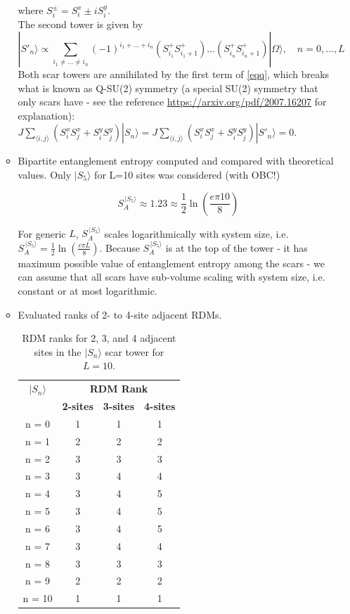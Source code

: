 \documentclass[11pt]{article}
\begin{document}
\begin{itemize}
\begin{itemize}
	where $S_i^\pm = S_i^x \pm i S_i^y$.\\
     The second tower is given by 
     \begin{equation}
	|S'_n\rangle \propto \sum_{i_1 \neq \hdots \neq i_n} (-1)^{i_1 + \hdots + i_n} \left(S^+_{i_1}S^+_{i_1+1}\right)\hdots\left(S^+_{i_n}S^+_{i_n+1}\right)  |\Omega\rangle, \quad n = 0,\hdots,L
	\end{equation}
	Both scar towers are annihilated by the first term of \eqref{eqq}, which breaks what is known as Q-SU(2) symmetry (a special SU(2) symmetry that only scars have - see the reference \href{https://arxiv.org/pdf/2007.16207}{https://arxiv.org/pdf/2007.16207} for explanation): $J \sum_{\langle i,j \rangle} \left( S^x_i S^x_j + S^y_i S^y_j \right)  |S_n\rangle = J \sum_{\langle i,j \rangle} \left( S^x_i S^x_j + S^y_i S^y_j \right)  |S'_n\rangle = 0$.
        \item Bipartite entanglement entropy computed and compared with theoretical values.
        Only $|S_5\rangle$ for L=10 sites was considered (with OBC!)
        
         \begin{equation}
        S^{\,|S_5\rangle}_A \approx 1.23 \approx \frac{1}{2} \ln \left(\frac{e \pi 10}{8}\right)
        \end{equation}
        
        For generic $L$, $S^{\,|S_5\rangle}_A$ scales logarithmically with system size, i.e. $S^{\,|S_5\rangle}_A = \frac{1}{2} \ln \left(\frac{e \pi L}{8}\right)$. Because $S^{\,|S_5\rangle}_A$ is at the top of the tower - it has maximum possible 						value of entanglement entropy among the scars - we can assume that all scars have sub-volume scaling with system size, i.e. constant or at most logarithmic.
        
        \item Evaluated ranks of 2- to 4-site adjacent RDMs.
         \begin{table}[H]
	\centering
	\begin{tabular}{|c|ccc|}
	\hline
	\textbf{$|S_n\rangle$} & \multicolumn{3}{c|}{\textbf{RDM Rank}} \\
	\cline{2-4}
	& \textbf{2-sites} & \textbf{3-sites} & \textbf{4-sites}\\
	\hline
	 n = 0 & 1 & 1 & 1 \\
	 n = 1 & 2 & 2 & 2 \\
	 n = 2 & 3 & 3 & 3 \\
	 n = 3 & 3 & 4 & 4 \\
	 n = 4 & 3 & 4 & 5 \\  
	 n = 5 & 3 & 4 & 5 \\
	 n = 6 & 3 & 4 & 5 \\
	 n = 7 & 3 & 4 & 4 \\
	 n = 8 & 3 & 3 & 3 \\
	 n = 9 & 2 & 2 & 2 \\
	 n = 10 & 1 & 1 & 1 \\
	\hline
	\end{tabular}
	\caption{RDM ranks for 2, 3, and 4 adjacent sites in the $|S_n\rangle$ scar tower for $L=10$.}
	\label{tab:ranks21}
	\end{table}


\end{itemize}
\end{itemize}
\end{document}
